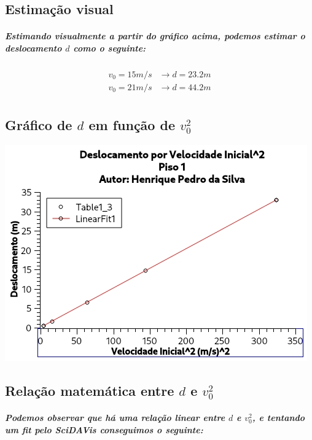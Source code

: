 \documentclass[12pt,twoside, a4paper, twocolumn]{article}
\begin{document}
\subsection{Estimação visual}

\subparagraph*{Estimando visualmente a partir do gráfico acima, podemos estimar o deslocamento $d$ como o seguinte:}

\begin{equation}
    \begin{aligned}
        v_0 = 15 m/s & \rightarrow d = 23.2 m \\
        v_0 = 21 m/s & \rightarrow d = 44.2 m \\
    \end{aligned}
\end{equation}

\subsection{Gráfico de $d$ em função de $v_0^2$}



\begin{adjustbox}{scale=0.75}
    \includegraphics{Grafico-1.jpg}
\end{adjustbox}

\subsection{Relação matemática entre $d$ e $v_0^2$}

\subparagraph*{Podemos observar que há uma relação linear entre $d$ e $v_0^2$, e tentando um \emph{fit} pelo SciDAVis conseguimos o seguinte: }
\end{document}
